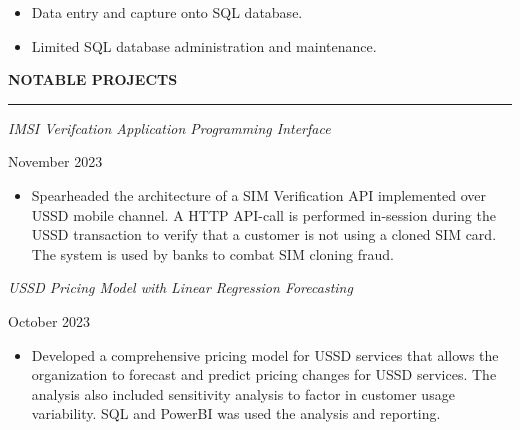 \documentclass[
  letterpaper,
  DIV=11,
  numbers=noendperiod]{scrartcl}
\providecommand{\tightlist}{%
  \setlength{\itemsep}{0pt}\setlength{\parskip}{0pt}}\usepackage{longtable,booktabs,array}
\begin{document}
\begin{itemize}
\tightlist
\item
  Data entry and capture onto SQL database.
\item
  Limited SQL database administration and maintenance.
\end{itemize}

\vspace{7pt}

\setlength{\columnsep}{-2.5cm}

\begin{large}
{\bf NOTABLE PROJECTS}
  \vspace{3pt}
  \hrule
  \begin{multicols}{2}
    \begin{flushleft}\textit{IMSI Verifcation Application Programming Interface}\end{flushleft}
    \begin{flushright}November 2023\end{flushright}
  \end{multicols}
  \vspace{-0.17cm}
\end{large}

\begin{itemize}
\tightlist
\item
  Spearheaded the architecture of a SIM Verification API implemented
  over USSD mobile channel. A HTTP API-call is performed in-session
  during the USSD transaction to verify that a customer is not using a
  cloned SIM card. The system is used by banks to combat SIM cloning
  fraud.
\end{itemize}

\vspace{5pt}

\begin{large}
  \begin{multicols}{2}
    \begin{flushleft}\textit{USSD Pricing Model with Linear Regression Forecasting}\end{flushleft}
    \begin{flushright}October 2023\end{flushright}
  \end{multicols}
  \vspace{-0.17cm}
\end{large}

\begin{itemize}
\tightlist
\item
  Developed a comprehensive pricing model for USSD services that allows
  the organization to forecast and predict pricing changes for USSD
  services. The analysis also included sensitivity analysis to factor in
  customer usage variability. SQL and PowerBI was used the analysis and
  reporting.
\end{itemize}
\end{document}
